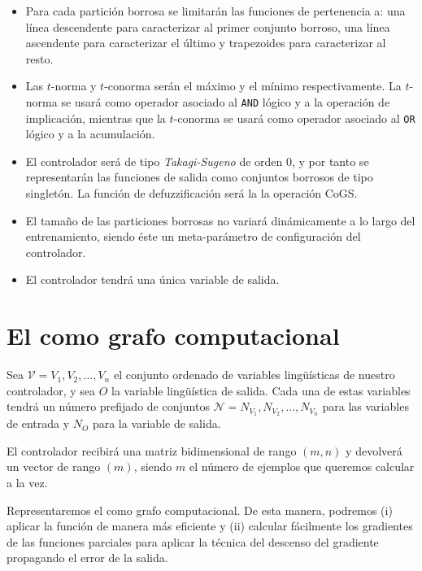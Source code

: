 \begin{itemize}
	\item Para cada partición borrosa se limitarán las funciones de pertenencia a: una línea descendente para caracterizar al primer conjunto borroso, una línea ascendente para caracterizar el último y trapezoides para caracterizar al resto.
	\item Las $t$-norma y $t$-conorma serán el máximo y el mínimo respectivamente. La $t$-norma se usará como operador asociado al \texttt{AND} lógico y a la operación de implicación, mientras que la $t$-conorma se usará como operador asociado al \texttt{OR} lógico y a la acumulación.
	\item El controlador será de tipo \textit{Takagi-Sugeno} de orden $0$, y por tanto se representarán las funciones de salida como conjuntos borrosos de tipo singletón. La función de defuzzificación será la la operación CoGS.
	\item El tamaño de las particiones borrosas no variará dinámicamente a lo largo del entrenamiento, siendo éste un meta-parámetro de configuración del controlador.
	\item El controlador tendrá una única variable de salida.
\end{itemize}

\section{El  como grafo computacional}

Sea $\mathcal{V} = {V_1, V_2, \ldots, V_n}$ el conjunto ordenado de variables lingüísticas de nuestro controlador, y sea $O$ la variable lingüística de salida. Cada una de estas variables tendrá un número prefijado de conjuntos $\mathcal{N} = {N_{V_1}, N_{V_2}, \ldots, N_{V_n}}$ para las variables de entrada y $N_O$ para la variable de salida.

El controlador recibirá una matriz bidimensional de rango $(m, n)$ y devolverá un vector de rango $(m)$, siendo $m$ el número de ejemplos que queremos calcular a la vez.

Representaremos el  como grafo computacional. De esta manera, podremos (i) aplicar la función de manera más eficiente y (ii) calcular fácilmente los gradientes de las funciones parciales para aplicar la técnica del descenso del gradiente propagando el error de la salida.

